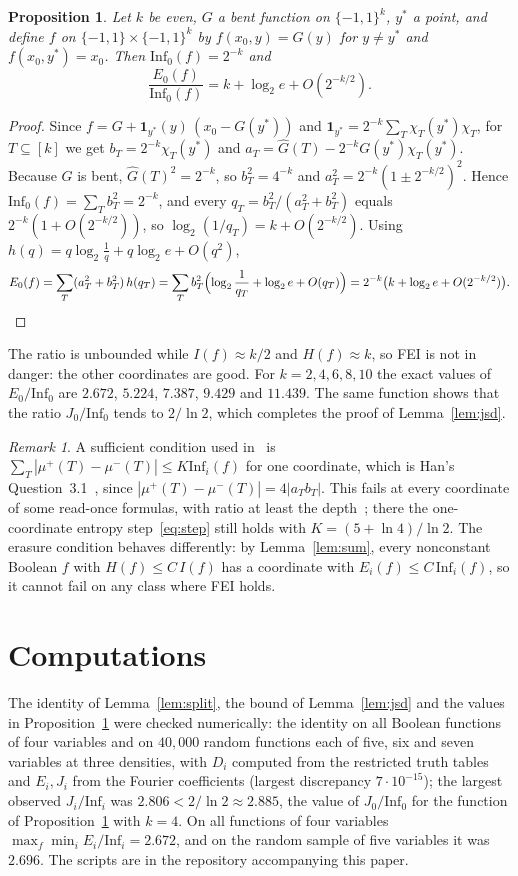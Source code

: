 \documentclass[11pt]{amsart}
\newtheorem{proposition}[theorem]{Proposition}
\theoremstyle{remark}
\newtheorem{remark}[theorem]{Remark}
\newcommand{\Inf}{\mathrm{Inf}}
\begin{document}
\begin{proposition}\label{prop:point}
Let $k$ be even, $G$ a bent function on $\{-1,1\}^k$, $y^*$ a point, and define $f$ on $\{-1,1\}\times\{-1,1\}^k$ by
$f(x_0,y)=G(y)$ for $y\neq y^*$ and $f(x_0,y^*)=x_0$. Then $\Inf_0(f)=2^{-k}$ and
\[
\frac{E_0(f)}{\Inf_0(f)}=k+\log_2e+O\!\left(2^{-k/2}\right).
\]
\end{proposition}

\begin{proof}
Since $f=G+\mathbf 1_{y^*}(y)\,(x_0-G(y^*))$ and $\mathbf 1_{y^*}=2^{-k}\sum_T\chi_T(y^*)\chi_T$, for
$T\subseteq[k]$ we get $b_T=2^{-k}\chi_T(y^*)$ and $a_T=\hat G(T)-2^{-k}G(y^*)\chi_T(y^*)$. Because $G$ is bent,
$\hat G(T)^2=2^{-k}$, so $b_T^2=4^{-k}$ and $a_T^2=2^{-k}(1\pm2^{-k/2})^2$. Hence $\Inf_0(f)=\sum_Tb_T^2=2^{-k}$, and
every $q_T=b_T^2/(a_T^2+b_T^2)$ equals $2^{-k}(1+O(2^{-k/2}))$, so $\log_2(1/q_T)=k+O(2^{-k/2})$. Using $h(q)=q\log_2\frac1q+q\log_2e+O(q^2)$,
\[
E_0(f)=\sum_T(a_T^2+b_T^2)\,h(q_T)=\sum_T b_T^2\Bigl(\log_2\frac1{q_T}+\log_2e+O(q_T)\Bigr)
=2^{-k}\bigl(k+\log_2e+O(2^{-k/2})\bigr).\qedhere
\]
\end{proof}

The ratio is unbounded while $I(f)\approx k/2$ and $H(f)\approx k$, so FEI is not in danger: the other
coordinates are good. For $k=2,4,6,8,10$ the exact values of $E_0/\Inf_0$ are $2.672$, $5.224$, $7.387$, $9.429$
and $11.439$. The same function shows that the ratio $J_0/\Inf_0$ tends to $2/\ln2$, which completes the proof of
Lemma~\ref{lem:jsd}.

\begin{remark}
A sufficient condition used in~\cite[Corollary 4.3]{GMP} is $\sum_T|\mu^+(T)-\mu^-(T)|\le K\Inf_i(f)$ for one
coordinate, which is Han's Question~3.1~\cite{Han}, since $|\mu^+(T)-\mu^-(T)|=4|a_Tb_T|$. This fails at every
coordinate of some read-once formulas, with ratio at least the depth~\cite{Shm}; there the one-coordinate entropy
step~\eqref{eq:step} still holds with $K=(5+\ln4)/\ln 2$. The erasure condition behaves differently: by Lemma~\ref{lem:sum}, every
nonconstant Boolean $f$ with $H(f)\le C\,I(f)$ has a coordinate with $E_i(f)\le C\,\Inf_i(f)$, so it cannot fail on
any class where FEI holds.
\end{remark}

\section{Computations}
The identity of Lemma~\ref{lem:split}, the bound of Lemma~\ref{lem:jsd} and the values in
Proposition~\ref{prop:point} were checked numerically: the identity on all Boolean functions of four variables and on
$40{,}000$ random functions each of five, six and seven variables at three densities, with $D_i$ computed from the
restricted truth tables and $E_i,J_i$ from the Fourier coefficients (largest discrepancy $7\cdot10^{-15}$); the
largest observed $J_i/\Inf_i$ was $2.806<2/\ln2\approx2.885$, the value of $J_0/\Inf_0$ for the function of
Proposition~\ref{prop:point} with $k=4$. On all functions of four variables
$\max_f\min_iE_i/\Inf_i=2.672$, and on the random sample of five variables it was $2.696$. The scripts are in the
repository accompanying this paper.
\end{document}

